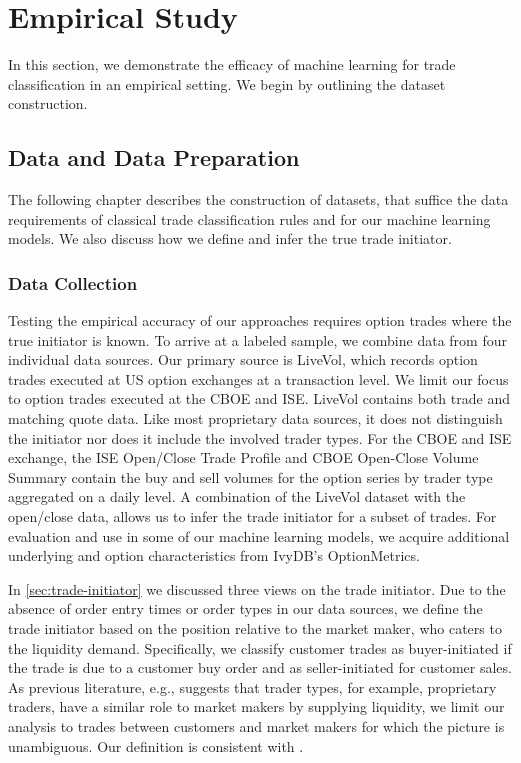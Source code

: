 \section{Empirical Study}\label{sec:empirical-study}

In this section, we demonstrate the efficacy of machine learning for trade classification in an empirical setting. We begin by outlining the dataset construction.

\subsection{Data and Data Preparation}\label{sec:data-and-data-preparation}

The following chapter describes the construction of datasets, that suffice the data requirements of classical trade classification rules and for our machine learning models. We also discuss how we define and infer the true trade initiator.

\subsubsection{Data Collection}\label{sec:data-collection}


Testing the empirical accuracy of our approaches requires option trades where the true initiator is known. To arrive at a labeled sample, we combine data from four individual data sources. Our primary source is LiveVol, which records option trades executed at US option exchanges at a transaction level. We limit our focus to option trades executed at the \gls{CBOE} and \gls{ISE}. LiveVol contains both trade and matching quote data. Like most proprietary data sources, it does not distinguish the initiator nor does it include the involved trader types. For the \gls{CBOE} and \gls{ISE} exchange, the \gls{ISE} Open/Close Trade Profile and \gls{CBOE} Open-Close Volume Summary contain the buy and sell volumes for the option series by trader type aggregated on a daily level. A combination of the LiveVol dataset with the open/close data, allows us to infer the trade initiator for a subset of trades. For evaluation and use in some of our machine learning models, we acquire additional underlying and option characteristics from IvyDB's OptionMetrics.

In \cref{sec:trade-initiator} we discussed three views on the trade initiator. Due to the absence of order entry times or order types in our data sources, we define the trade initiator based on the position relative to the market maker, who caters to the liquidity demand. Specifically, we classify customer trades as buyer-initiated if the trade is due to a customer buy order and as seller-initiated for customer sales. As previous literature, e.g., \textcite[][4276]{garleanuDemandBasedOptionPricing2009} suggests that trader types, for example, proprietary traders, have a similar role to market makers by supplying liquidity, we limit our analysis to trades between customers and market makers for which the picture is unambiguous. Our definition is consistent with \textcite[][8]{grauerOptionTradeClassification2022}.


